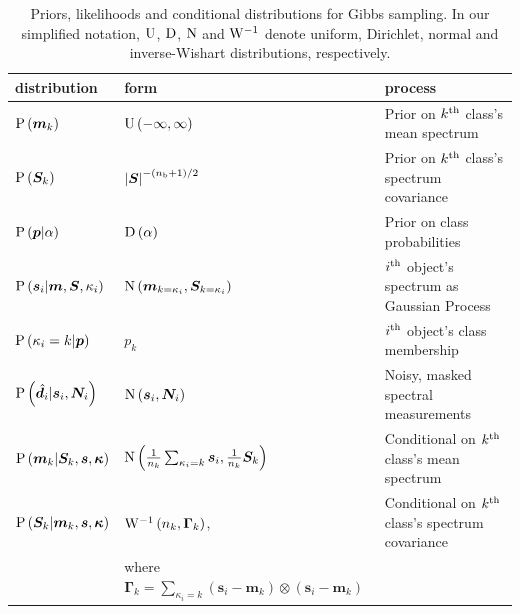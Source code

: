 \documentclass[a4paper,fleqn,usenatbib]{mnras}
\newcommand{\nb}{n_{\rm b}}
\newcommand{\prob}{{\rm P}}
\newcommand{\normal}{{\rm{N}}}
\newcommand{\uniform}{{\rm U}}
\newcommand{\dirichlet}{{\rm D}}
\newcommand{\invwish}{{\rm W}^{-1}}
\newcommand{\specmean}{{\bm m}}
\newcommand{\speccov}{{\bm S}}
\newcommand{\classprob}{{p}}
\newcommand{\classprobs}{{\bm p}}
\newcommand{\objspec}{{\bm s}}
\newcommand{\objclass}{{\kappa}}
\newcommand{\objclasses}{{\bm \kappa}}
\newcommand{\objdata}{\hat{\bm d}}
\newcommand{\objnoise}{{\bm N}}
\newcommand{\scalemat}{{\bm \Gamma}}
\begin{document}
\begin{table}
    \centering
    \caption{Priors, likelihoods and conditional distributions for Gibbs sampling. In our simplified notation, $\uniform$, $\dirichlet$, $\normal$ and $\invwish$ denote uniform, Dirichlet, normal and inverse-Wishart distributions, respectively.}
    \label{tab:prob_dists}
    \begin{tabular}{lll}
        \hline
        distribution & form & process \\
        \hline
        $\prob\left(\specmean_k\right)$ & $\uniform\left(-\infty,\infty\right)$ & Prior on $k^{\rm th}$ class's mean spectrum \\
        $\prob\left(\speccov_k\right)$ & $\left| \speccov \right|^{-\left(\nb+1\right)/2}$ & Prior on $k^{\rm th}$ class's spectrum covariance \\
        $\prob\left(\classprobs|\alpha\right)$ & $\dirichlet\left(\alpha\right)$ & Prior on class probabilities \\
        $\prob\left(\objspec_i|\specmean,\speccov,\objclass_i\right)$ & $\normal\left(\specmean_{k=\objclass_i},\speccov_{k=\objclass_i}\right)$ & $i^{\rm th}$ object's spectrum as Gaussian Process \\
        $\prob\left(\objclass_i = k|\classprobs\right)$ & $\classprob_k$ & $i^{\rm th}$ object's class membership \\
        $\prob\left(\objdata_i|\objspec_i,\objnoise_i\right)$ & $\normal\left(\objspec_i,\objnoise_i\right)$ & Noisy, masked spectral measurements \\
        \hline
        $\prob\left(\specmean_k | \speccov_k, \objspec, \objclasses \right)$ & $\normal \left( \frac{1}{n_k} \sum_{\objclass_i = k} \objspec_i, \frac{1}{n_k} \speccov_k \right)$ & Conditional on $k^{\rm th}$ class's mean spectrum \\
        $\prob\left(\speccov_k | \specmean_k, \objspec, \objclasses \right)$ & $\invwish \left(n_k, \scalemat_k \right)$, & Conditional on $k^{\rm th}$ class's spectrum covariance \\
         & where  $\scalemat_k = \sum_{\objclass_i = k} \left( \objspec_i - \specmean_k \right) \otimes \left( \objspec_i - \specmean_k \right)$ & \\

\end{tabular}
\end{table}
\end{document}
